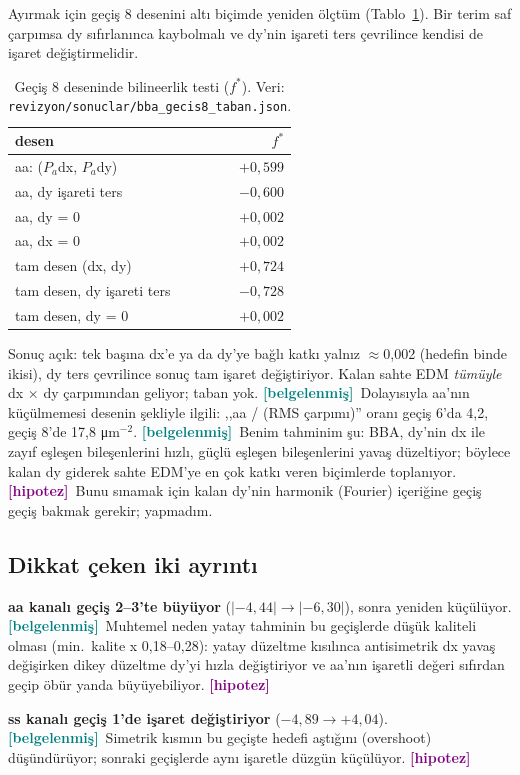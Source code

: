 \documentclass[11pt,a4paper]{article}
\newcommand{\bel}{\textcolor{teal}{\textbf{\footnotesize [belgelenmiş]}}}
\newcommand{\hip}{\textcolor{purple}{\textbf{\footnotesize [hipotez]}}}
\newcommand{\kod}[1]{{\XeTeXinterchartokenstate=0 \texttt{#1}}}
\begin{document}
Ayırmak için geçiş 8 desenini altı biçimde yeniden ölçtüm (Tablo~\ref{tab:taban}). Bir terim
saf çarpımsa dy sıfırlanınca kaybolmalı ve dy'nin işareti ters çevrilince kendisi de işaret
değiştirmelidir.

\begin{table}[h]\centering\small
\caption{Geçiş 8 deseninde bilineerlik testi ($f^*$). Veri:
\kod{revizyon/sonuclar/bba\_gecis8\_taban.json}.}\label{tab:taban}
\begin{tabular}{lr}\toprule
desen & $f^*$\\\midrule
aa: ($P_a$dx, $P_a$dy) & $+0{,}599$\\
aa, dy işareti ters & $-0{,}600$\\
aa, dy = 0 & $+0{,}002$\\
aa, dx = 0 & $+0{,}002$\\
tam desen (dx, dy) & $+0{,}724$\\
tam desen, dy işareti ters & $-0{,}728$\\
tam desen, dy = 0 & $+0{,}002$\\
\bottomrule\end{tabular}\end{table}

Sonuç açık: tek başına dx'e ya da dy'ye bağlı katkı yalnız $\approx$0{,}002 (hedefin binde ikisi), dy
ters çevrilince sonuç tam işaret değiştiriyor. Kalan sahte EDM \emph{tümüyle} dx $\times$ dy
çarpımından geliyor; taban yok. \bel\ Dolayısıyla aa'nın küçülmemesi desenin şekliyle ilgili:
,,aa / (RMS çarpımı)'' oranı geçiş 6'da 4{,}2, geçiş 8'de 17{,}8 μm$^{-2}$. \bel\ Benim tahminim
şu: BBA, dy'nin dx ile zayıf eşleşen bileşenlerini hızlı, güçlü eşleşen bileşenlerini yavaş
düzeltiyor; böylece kalan dy giderek sahte EDM'ye en çok katkı veren biçimlerde toplanıyor. \hip\
Bunu sınamak için kalan dy'nin harmonik (Fourier) içeriğine geçiş geçiş bakmak gerekir; yapmadım.

\subsection*{Dikkat çeken iki ayrıntı}
\textbf{aa kanalı geçiş 2--3'te büyüyor} ($|{-4{,}44}| \to |{-6{,}30}|$), sonra yeniden
küçülüyor. \bel\ Muhtemel neden yatay tahminin bu geçişlerde düşük kaliteli olması
(min.~kalite x 0{,}18--0{,}28): yatay düzeltme kısılınca antisimetrik dx yavaş değişirken dikey
düzeltme dy'yi hızla değiştiriyor ve aa'nın işaretli değeri sıfırdan geçip öbür yanda
büyüyebiliyor. \hip

\textbf{ss kanalı geçiş 1'de işaret değiştiriyor} ($-4{,}89 \to +4{,}04$). \bel\ Simetrik
kısmın bu geçişte hedefi aştığını (overshoot) düşündürüyor; sonraki geçişlerde aynı işaretle
düzgün küçülüyor. \hip
\end{document}

